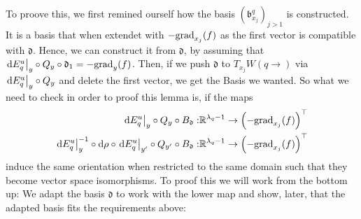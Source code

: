 \begin{Iprove}
	To proove this, we first remined ourself how the basis $({\mathfrak{b}^q_{x_j}})_{j>1}$ is constructed. It is a basis that when extendet with $-\mathrm{grad}_{x_j}(f)$ as the first vector is compatible with $\mathfrak{d}$. Hence, we can construct it from $\mathfrak{d}$, by assuming that $\left.\mathop{}\!\mathrm{d} E^u_q\right|_{y}\circ Q_y\circ \mathfrak{d}_1=-\mathrm{grad}_y(f)$. Then, if we push $\mathfrak{d}$ to $T_{x_j}W(q\to)$ via $\left.\mathop{}\!\mathrm{d} E^u_q\right|_{y}\circ Q_y$ and delete the first vector, we get the Basis we wanted. So what we need to check in order to proof this lemma is, if the maps
	\begin{align*}
		\left.\mathop{}\!\mathrm{d} E^u_q\right|_{y}\circ Q_y\circ B_{\mathfrak{d}}: &\mathbb{R}^{\lambda_q-1}\to \left(-\mathrm{grad}_{x_j}(f)\right)^\top\\
		\left.\mathop{}\!\mathrm{d} E^u_q\right|_{y}^{-1}\circ \mathop{}\!\mathrm{d} \rho \circ \left.\mathop{}\!\mathrm{d} E^u_q\right|_{y'}\circ Q_{y'}\circ B_{\mathfrak{d}}: &\mathbb{R}^{\lambda_q-1}\to \left(-\mathrm{grad}_{x_j}(f)\right)^\top
	\end{align*} induce the same orientation when restricted to the same domain such that they become vector space isomorphisms. 
	To proof this we will work from the bottom up: We adapt the basis $\mathfrak{d}$ to work with the lower map and show, later, that the adapted basis fits the requirements above:
\end{Iprove}
